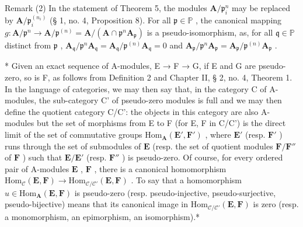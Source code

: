 Remark (2) In the statement of Theorem 5, the modules \(\mathbf{A} / \mathfrak{p}_i^n\) may be replaced by \(\mathbf{A} / \mathfrak{p}_i^{(n_i)}\) (§ 1, no. 4, Proposition 8). For all \(\mathfrak{p} \in \mathbb{P}\) , the canonical mapping \(g\colon \mathbf{A} / \mathfrak{p}^n \to \mathbf{A} / \mathfrak{p}^{(n)} = \mathbf{A} / (\mathbf{A} \cap \mathfrak{p}^n \mathbf{A}_{\mathfrak{p}})\) is a pseudo-isomorphism, as, for all \(\mathfrak{q} \in \mathbb{P}\) distinct from \(\mathfrak{p}\) , \(\mathbf{A}_{\mathfrak{q}} / \mathfrak{p}^n \mathbf{A}_{\mathfrak{q}} = \mathbf{A}_{\mathfrak{q}} / \mathfrak{p}^{(n)} \mathbf{A}_{\mathfrak{q}} = 0\) and \(\mathbf{A}_{\mathfrak{p}} / \mathfrak{p}^n \mathbf{A}_{\mathfrak{p}} = \mathbf{A}_{\mathfrak{p}} / \mathfrak{p}^{(n)} \mathbf{A}_{\mathfrak{p}}\) .

* Given an exact sequence of A-modules, E → F → G, if E and G are pseudo-zero, so is F, as follows from Definition 2 and Chapter II, § 2, no. 4, Theorem 1. In the language of categories, we may then say that, in the category C of A-modules, the sub-category C' of pseudo-zero modules is full and we may then define the quotient category C/C': the objects in this category are also A-modules but the set of morphisms from E to F (for E, F in C/C') is the direct limit of the set of commutative groups \(\mathrm{Hom}_{\mathbf{A}}(\mathbf{E}',\mathbf{F}')\) , where \(\mathbf{E}'\) (resp. \(\mathbf{F}'\) ) runs through the set of submodules of \(\mathbf{E}\) (resp. the set of quotient modules \(\mathbf{F} / \mathbf{F}''\) of \(\mathbf{F}\) ) such that \(\mathbf{E} / \mathbf{E}'\) (resp. \(\mathbf{F}''\) ) is pseudo-zero. Of course, for every ordered pair of A-modules \(\mathbf{E}\) , \(\mathbf{F}\) , there is a canonical homomorphism \(\mathrm{Hom}_{\mathcal{C}}(\mathbf{E},\mathbf{F})\to \mathrm{Hom}_{\mathcal{C} / \mathcal{C}'}(\mathbf{E},\mathbf{F})\) . To say that a homomorphism \(u\in \mathrm{Hom}_{\mathbf{A}}(\mathbf{E},\mathbf{F})\) is pseudo-zero (resp. pseudo-injective, pseudo-surjective, pseudo-bijective) means that its canonical image in \(\mathrm{Hom}_{\mathcal{C} / \mathcal{C}'}(\mathbf{E},\mathbf{F})\) is zero (resp. a monomorphism, an epimorphism, an isomorphism).*

